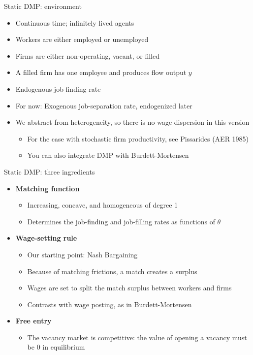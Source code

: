 \documentclass[9pt]{beamer}
\newcommand{\bit}{\begin{itemize}}
\newcommand{\eit}{\end{itemize}}
\newcommand{\bc}{\color{blue}}
\begin{document}
\begin{frame}{Static DMP: environment}

\bit
\setlength\itemsep{1.5em}

\item Continuous time; infinitely lived agents

\item Workers are either employed or unemployed

\item Firms are either non-operating, vacant, or filled

\item A filled firm has one employee and produces flow output $y$

\item {\bc Endogenous job-finding rate}

\item For now: Exogenous job-separation rate, endogenized later

\item We abstract from heterogeneity, so there is no wage dispersion in this version
\bit
\setlength\itemsep{0.5em}
	\item For the case with stochastic firm productivity, see Pissarides (AER 1985)
	
	\item You can also integrate DMP with Burdett-Mortensen
\eit

\eit

\end{frame}


\begin{frame}{Static DMP: three ingredients}

\bit
\setlength\itemsep{2em}


\item \bf Matching function \normalfont
\bit
\setlength\itemsep{0.5em}
	\item Increasing, concave, and homogeneous of degree 1
	\item Determines the job-finding and job-filling rates as functions of $\theta$
\eit

\item \bf Wage-setting rule \normalfont
\bit
\setlength\itemsep{0.5em}
	\item Our starting point: {\bc Nash Bargaining}
\item Because of matching frictions, a match creates a surplus
	\item Wages are set to split the match surplus between workers and firms 
	\item Contrasts with wage posting, as in Burdett-Mortensen
\eit

\item \bf Free entry \normalfont
\bit
	\item The vacancy market is competitive: the value of opening a vacancy must be $0$ in equilibrium
\eit

\eit

\end{frame}
\end{document}
